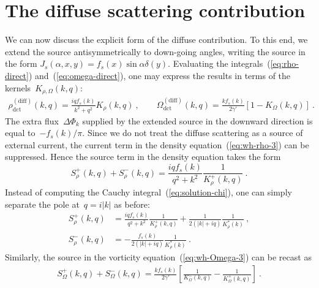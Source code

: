 \documentclass[preprint,aps,eqsecnum, prb]{revtex4-1}
\newcommand{\fplus}[1]{{#1}^{+}}
\newcommand{\fminus}[1]{{#1}^{-}}
\newcommand{\dct}[1]{{#1}_\mathrm{dct}}
\begin{document}
\section{The diffuse scattering contribution}
\label{sec:diffuse}

We can now discuss the explicit form of the diffuse contribution.
To this end, we extend the source antisymmetrically to down-going angles,
writing the source in the form
$J_{s}(\alpha, x, y) =  f_s(x) \sin\alpha \delta(y)$.
Evaluating the integrals~(\ref{eq:rho-direct}) and~(\ref{eq:omega-direct}),
one may express the results in terms of the kernels~$K_{\rho, \Omega}(k, q)$:
\begin{align}
\dct{\rho}^\mathrm{(diff)}(k, q) = \frac{iq f_s(k)}{k^2 + q^2} K_\rho(k, q)\ ,
\qquad
\dct{\Omega}^\mathrm{(diff)}(k, q) = \frac{k f_s(k)}{2\gamma'} \left[1 - K_\Omega(k, q)\right] \ .
\end{align}
The extra flux~$\Delta\Phi_{k}$
supplied by the extended source in the downward direction
is equal to~$-f_s(k)/\pi$.
Since we do not treat the diffuse scattering as a source of external current,
the current term in the density equation~(\ref{eq:wh-rho-3}) can
be suppressed.
Hence the source term in the density equation takes the form
\begin{equation}
  \fplus{S}_\rho(k, q) + \fminus{S}_\rho(k, q) =
  \frac{iq f_s(k)}{q^2 + k^2} \frac{1}{\fplus{K}_\rho(k, q)}\ .
\end{equation}
Instead of computing the Cauchy integral~(\ref{eq:solution-chi}),
one can simply separate the pole at~$q = i|k|$ as before:
\begin{align}
  \fplus{S}_\rho(k, q) &= \frac{iq f_s(k)}{q^2 + k^2}
  \frac{1}{\fplus{K}_\rho(k, q)}
  + \frac{1}{2(|k| + iq)} \frac{1}{K_\rho^\ast(k)}\ , \\
  \fminus{S}_\rho(k, q) &= - \frac{f_s(k)}{2(|k| + iq)}
                          \frac{1}{K_\rho^\ast(k)}
  \ .
\end{align}
Similarly, the source in the vorticity equation~(\ref{eq:wh-Omega-3}) can be
recast as
\begin{align}
  \fplus{S}_\Omega(k, q) + \fminus{S}_\Omega(k, q) =
  \frac{k f_s(k)}{2\gamma'} \left[\frac{1}{\fminus{K}_\Omega(k, q)}
  - \frac{1}{\fplus{K}_\Omega(k, q)} \right]\ .
\end{align}
\end{document}
